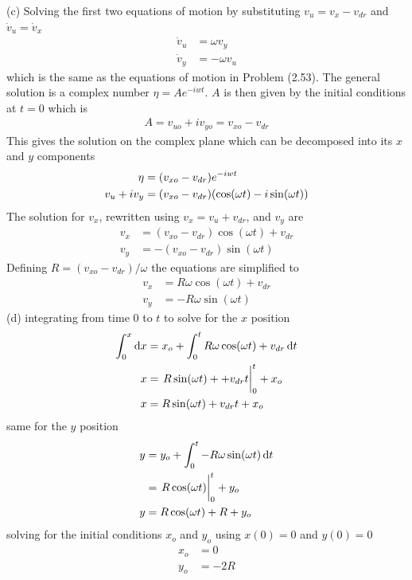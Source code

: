 \documentclass[../problems.tex]{subfiles}
\begin{document}
(c) Solving the first two equations of motion by substituting $v_u = v_x - v_{dr}$ and 
$\dot{v}_u = \dot{v}_x$
\begin{align*}
    \dot{v}_u &= \omega v_y \\
    \dot{v}_y &= -\omega v_u
\end{align*}
which is the same as the equations of motion in Problem (2.53). The general solution is a complex
number $\eta = Ae^{-iwt}$. $A$ is then given by the initial conditions at $t=0$ which is
\begin{align*}
    A = v_{uo} + iv_{yo} = v_{xo} - v_{dr}
\end{align*}
This gives the solution on the complex plane which can be decomposed into its $x$ and $y$ components
\begin{align*}
    \eta &= (v_{xo} - v_{dr})e^{-iwt} \\
    v_u + iv_y &= (v_{xo}-v_{dr}) \quantity(\cos(\omega t) - i\sin(\omega t))
\end{align*}
The solution for $v_x$, rewritten using $v_x = v_u + v_{dr}$, and $v_y$ are
\begin{align*}
    v_x &= (v_{xo}-v_{dr})\cos(\omega t) + v_{dr}\\
    v_y &= -(v_{xo}-v_{dr})\sin(\omega t)
\end{align*}
Defining $R=(v_{xo}-v_{dr})/\omega$ the equations are simplified to
\begin{align*}
    v_x &= R\omega \cos(\omega t) + v_{dr}\\
    v_y &= -R\omega \sin(\omega t)
\end{align*}
(d) integrating from time 0 to $t$ to solve for the $x$ position
\begin{align*}
    \int_{0}^{x}\dd{x} &= x_o + \int_{0}^{t} R\omega \cos(\omega t) + v_{dr} \dd{t}\\
    x &= \eval{R\sin(\omega t) + + v_{dr}t}_{0}^{t} + x_o \\
    x &= R \sin(\omega t) + v_{dr}t + x_o\\
\end{align*}
same for the $y$ position
\begin{align*}
    y &= y_o + \int_{0}^t -R\omega \sin(\omega t) \dd{t} \\
    &= \eval{R\cos(\omega t)}_{0}^{t} + y_o\\
    y &= R\cos(\omega t) + R + y_o
\end{align*}
solving for the initial conditions $x_o$ and $y_o$ using $x(0) = 0$ and $y(0) = 0$
\begin{align*}
    x_o &= 0 \\
    y_o &= -2R
\end{align*}
\end{document}
